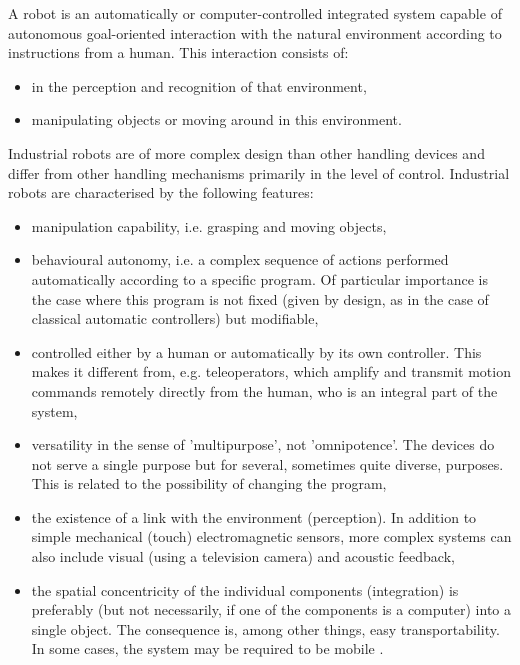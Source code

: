 A robot is an automatically or computer-controlled integrated system capable of autonomous goal-oriented interaction with the natural environment according to instructions from a human. This
interaction consists of:

\begin{itemize}

    \item in the perception and recognition of that environment,
    \item manipulating objects or moving around in this environment. 

\end{itemize}

 Industrial robots are of more complex design than other handling devices and differ from other handling mechanisms primarily in the level of control.  Industrial robots are characterised by the following features:
 
\begin{itemize}
 
    \item  manipulation capability, i.e. grasping and moving objects, 
    \item behavioural autonomy, i.e. a complex sequence of actions performed automatically according to a specific program. Of particular importance is the case where this program is not fixed (given by design, as in the case of classical automatic controllers) but modifiable,
    \item controlled either by a human or automatically by its own controller.  This makes it different from, e.g. teleoperators, which amplify and transmit motion commands remotely directly from the human, who is an integral part of the system,
    \item versatility in the sense of 'multipurpose', not 'omnipotence'. The devices do not serve a single purpose but for several, sometimes quite diverse, purposes. This is related to the possibility of changing the program,
    \item the existence of a link with the environment (perception). In addition to simple mechanical (touch) electromagnetic sensors, more complex systems can also include visual (using a television camera) and acoustic feedback,
    \item the spatial concentricity of the individual components (integration) is preferably (but not necessarily, if one of the components is a computer) into a single object. The consequence is, among other things, easy transportability. In some cases, the system may be required to be mobile \cite{vsb_2007}.

\end{itemize}

